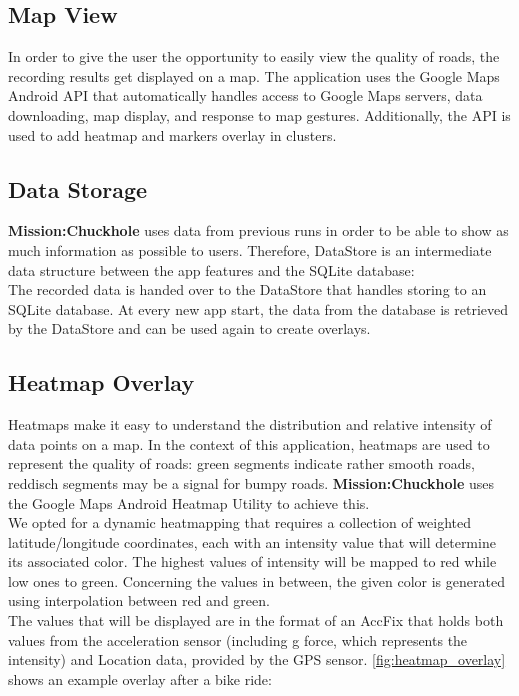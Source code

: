 \documentclass[10pt,a4paper]{article} %
\begin{document}
    
    	
    	
    
    
    



    \subsection{Map View}
    	In order to give the user the opportunity to easily view the quality of roads, the recording results get displayed on a map. The application uses the Google Maps Android API that automatically handles access to Google Maps servers, data downloading, map display, and response to map gestures. 
    Additionally, the API is used to add heatmap and markers overlay in clusters.


    \subsection{Data Storage}
    \textbf{Mission:Chuckhole} uses data from previous runs in order to be able to show as much information as possible to users.
    	Therefore, DataStore is an intermediate data structure between the app features and the SQLite database:\\
	The recorded data is handed over to the DataStore that handles storing to an SQLite database.
	At every new app start, the data from the database is retrieved by the DataStore and can be used again to create overlays.    

    
    \subsection{Heatmap Overlay}
    

	Heatmaps make it easy to understand the distribution and relative intensity of data points on a map.
	In the context of this application, heatmaps are used to represent the quality of roads: green segments indicate rather smooth roads, reddisch segments may be a signal for bumpy roads.
	\textbf{Mission:Chuckhole} uses the Google Maps Android Heatmap Utility to achieve this.\\
    	We opted for a dynamic heatmapping that requires a collection of weighted latitude/longitude coordinates, each with an intensity value that will determine its associated color.
    	The highest values of intensity will be mapped to red while low ones to green. Concerning the values in between, the given color is generated using interpolation between red and green. \\
    	The values that will be displayed are in the format of an AccFix that holds both values from the acceleration sensor (including g force, which represents the intensity) and Location data, provided by the GPS sensor.
	\autoref{fig:heatmap_overlay} shows an example overlay after a bike ride:
     
\end{document}
